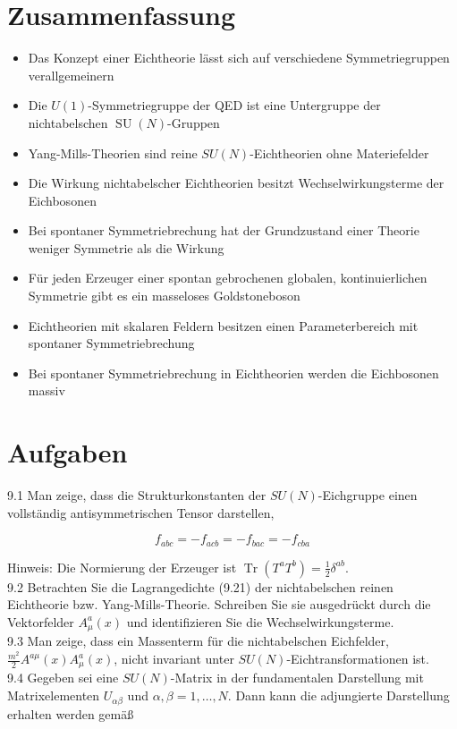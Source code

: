 \documentclass[10pt, letterpaper]{article}
\begin{document}
\section*{Zusammenfassung}
\begin{itemize}
  \item Das Konzept einer Eichtheorie lässt sich auf verschiedene Symmetriegruppen verallgemeinern
  \item Die $U(1)$-Symmetriegruppe der QED ist eine Untergruppe der nichtabelschen $\operatorname{SU}(N)$-Gruppen
  \item Yang-Mills-Theorien sind reine $S U(N)$-Eichtheorien ohne Materiefelder
  \item Die Wirkung nichtabelscher Eichtheorien besitzt Wechselwirkungsterme der Eichbosonen
  \item Bei spontaner Symmetriebrechung hat der Grundzustand einer Theorie weniger Symmetrie als die Wirkung
  \item Für jeden Erzeuger einer spontan gebrochenen globalen, kontinuierlichen Symmetrie gibt es ein masseloses Goldstoneboson
  \item Eichtheorien mit skalaren Feldern besitzen einen Parameterbereich mit spontaner Symmetriebrechung
  \item Bei spontaner Symmetriebrechung in Eichtheorien werden die Eichbosonen massiv
\end{itemize}

\section*{Aufgaben}
9.1 Man zeige, dass die Strukturkonstanten der $S U(N)$-Eichgruppe einen vollständig antisymmetrischen Tensor darstellen,

$$
f_{a b c}=-f_{a c b}=-f_{b a c}=-f_{c b a}
$$

Hinweis: Die Normierung der Erzeuger ist $\operatorname{Tr}\left(T^{a} T^{b}\right)=\frac{1}{2} \delta^{a b}$.\\
9.2 Betrachten Sie die Lagrangedichte (9.21) der nichtabelschen reinen Eichtheorie bzw. Yang-Mills-Theorie. Schreiben Sie sie ausgedrückt durch die Vektorfelder $A_{\mu}^{a}(x)$ und identifizieren Sie die Wechselwirkungsterme.\\
9.3 Man zeige, dass ein Massenterm für die nichtabelschen Eichfelder, $\frac{m^{2}}{2} A^{a \mu}(x) A_{\mu}^{a}(x)$, nicht invariant unter $S U(N)$-Eichtransformationen ist.\\
9.4 Gegeben sei eine $S U(N)$-Matrix in der fundamentalen Darstellung mit Matrixelementen $U_{\alpha \beta}$ und $\alpha, \beta=1, \ldots, N$. Dann kann die adjungierte Darstellung erhalten werden gemäß
\end{document}
